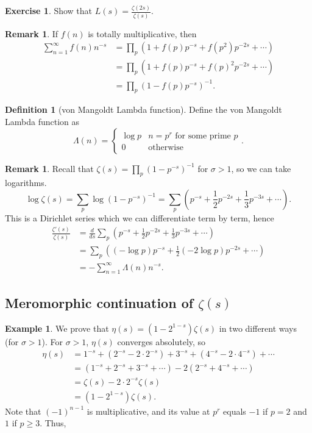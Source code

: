 \documentclass[11pt]{article}
\theoremstyle{definition}
\newtheorem{defn}[thm]{Definition}
\newtheorem{example}[thm]{Example}
\newtheorem{exe}[thm]{Exercise}
\newtheorem{remark}[thm]{Remark}
\newcommand{\s}[0]{\sigma}
\newcommand{\La}[0]{\Lambda}
\begin{document}
\begin{exe}
Show that $L(s) = \frac{\zeta(2s)}{\zeta(s)}$.
\end{exe}

\begin{remark}
If $f(n)$ is totally multiplicative, then
\begin{align*}
\sum_{n=1}^\infty f(n)n^{-s}
&= \prod_p \left(1 + f(p)p^{-s} + f(p^2)p^{-2s} + \cdots \right) \\
&= \prod_p \left(1 + f(p)p^{-s} + f(p)^2p^{-2s} + \cdots \right) \\
&= \prod_p \left(1 - f(p)p^{-s} \right) ^{-1} .
\end{align*}
\end{remark}

\begin{defn}[von Mangoldt Lambda function]
Define the von Mangoldt Lambda function as
\[
  \La(n) = \begin{cases}
    \log p &n=p^r \text{ for some prime } p \\
    0 &\text{otherwise}
  \end{cases} .
\]
\end{defn}

\begin{remark}
Recall that $\zeta(s)=\prod_p(1-p^{-s})^{-1}$ for $\s>1$, so we can take logarithms.
\[
\log \zeta(s) = \sum_p \log (1-p^{-s})^{-1}
= \sum_p \left(p^{-s} + \frac12 p^{-2s} + \frac13 p^{-3s} + \cdots \right) .
\]
This is a Dirichlet series which we can differentiate term by term, hence
\begin{align*}
\frac{\zeta'(s)}{\zeta(s)}
&= \frac{d}{ds} \sum_p\left(p^{-s}+\frac12p^{-2s}+\frac13p^{-3s}+\cdots\right) \\
&= \sum_p\left((-\log p)p^{-s} + \frac12(-2\log p)p^{-2s} + \cdots \right) \\
&= -\sum_{n=1}^\infty \La(n)n^{-s} .
\end{align*}
\end{remark}

\subsection{Meromorphic continuation of $\zeta(s)$}

\begin{example}
We prove that $\eta(s)=(1-2^{1-s})\zeta(s)$ in two different ways (for $\s>1$).
\proof[Proof 1]
For $\s>1$, $\eta(s)$ converges absolutely, so
\begin{align*}
\eta(s)
&= 1^{-s} + (2^{-s}-2\cdot 2^{-s}) + 3^{-s} + (4^{-s}-2\cdot 4^{-s}) + \cdots \\
&= (1^{-s} + 2^{-s} + 3^{-s} + \cdots) - 2(2^{-s} + 4^{-s} + \cdots) \\
&= \zeta(s) - 2\cdot 2^{-s} \zeta(s) \\
&= (1-2^{1-s})\zeta(s) .
\end{align*}
\proof[Proof 2]
Note that $(-1)^{n-1}$ is multiplicative, and its value at $p^r$ equals $-1$ if $p=2$ and
$1$ if $p\ge3$. Thus,
\end{example}
\end{document}
